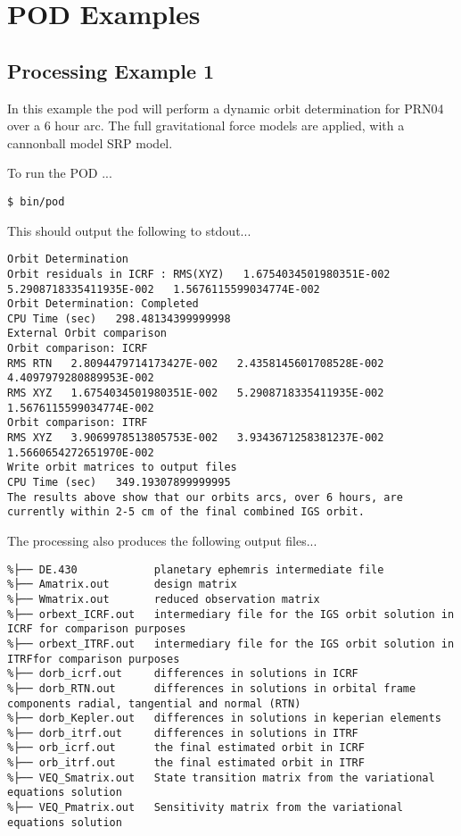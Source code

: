 \chapter{POD Examples}
\label{ch:pod_examples}

\section{Processing Example 1}
In this example the pod will perform a dynamic orbit determination for PRN04 over a 6 hour arc. 
The full gravitational force models are applied, with a cannonball model SRP model.

To run the POD ...
\begin{lstlisting}
$ bin/pod
\end{lstlisting}

This should output the following to stdout...
\begin{lstlisting}
Orbit Determination
Orbit residuals in ICRF : RMS(XYZ)   1.6754034501980351E-002   5.2908718335411935E-002   1.5676115599034774E-002
Orbit Determination: Completed
CPU Time (sec)   298.48134399999998
External Orbit comparison
Orbit comparison: ICRF
RMS RTN   2.8094479714173427E-002   2.4358145601708528E-002   4.4097979280889953E-002
RMS XYZ   1.6754034501980351E-002   5.2908718335411935E-002   1.5676115599034774E-002
Orbit comparison: ITRF
RMS XYZ   3.9069978513805753E-002   3.9343671258381237E-002   1.5660654272651970E-002
Write orbit matrices to output files
CPU Time (sec)   349.19307899999995
The results above show that our orbits arcs, over 6 hours, are currently within 2-5 cm of the final combined IGS orbit.
\end{lstlisting}

The processing also produces the following output files...
\begin{verbatim}
%├── DE.430            planetary ephemris intermediate file
%├── Amatrix.out       design matrix
%├── Wmatrix.out       reduced observation matrix
%├── orbext_ICRF.out   intermediary file for the IGS orbit solution in ICRF for comparison purposes
%├── orbext_ITRF.out   intermediary file for the IGS orbit solution in ITRFfor comparison purposes
%├── dorb_icrf.out     differences in solutions in ICRF
%├── dorb_RTN.out      differences in solutions in orbital frame components radial, tangential and normal (RTN)
%├── dorb_Kepler.out   differences in solutions in keperian elements 
%├── dorb_itrf.out     differences in solutions in ITRF 
%├── orb_icrf.out      the final estimated orbit in ICRF
%├── orb_itrf.out      the final estimated orbit in ITRF
%├── VEQ_Smatrix.out   State transition matrix from the variational equations solution
%├── VEQ_Pmatrix.out   Sensitivity matrix from the variational equations solution
\end{verbatim}

